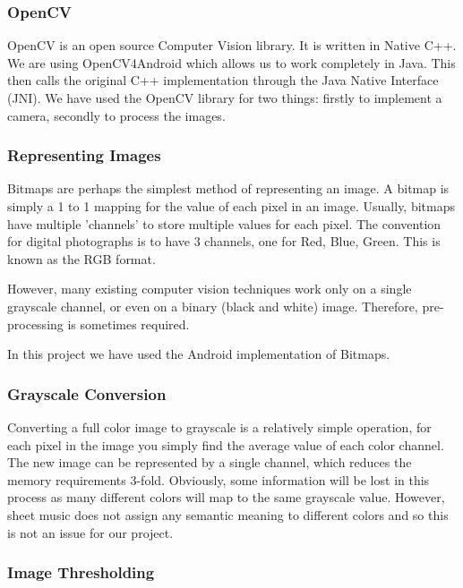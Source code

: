         \subsubsection{OpenCV}
            OpenCV\cite{OpenCV} is an open source Computer Vision library. It is written in Native C++. We are using OpenCV4Android\cite{OpenCV4Android} which allows us to work completely in Java. This then calls the original C++ implementation through the Java Native Interface (JNI)\cite{JNI}. We have used the OpenCV library for two things: firstly to implement a camera, secondly to process the images.

        \subsubsection{Representing Images}

Bitmaps are perhaps the simplest method of representing an image. A bitmap is simply a 1 to 1 mapping for the value of each pixel in an image. Usually, bitmaps have multiple 'channels' to store multiple values for each pixel. The convention for digital photographs is to have 3 channels, one for Red, Blue, Green. This is known as the RGB format.

However, many existing computer vision techniques work only on a single grayscale channel, or even on a binary (black and white) image. Therefore, pre-processing is sometimes required.

In this project we have used the Android implementation of Bitmaps\cite{Bitmap}.

        \subsubsection{Grayscale Conversion} \label{sec:grayscale}

Converting a full color image to grayscale is a relatively simple operation, for each pixel in the image you simply find the average value of each color channel. The new image can be represented by a single channel, which reduces the memory requirements 3-fold. Obviously, some information will be lost in this process as many different colors will map to the same grayscale value. However, sheet music does not assign any semantic meaning to different colors and so this is not an issue for our project.

        \subsubsection{Image Thresholding} \label{sec:threshold}

